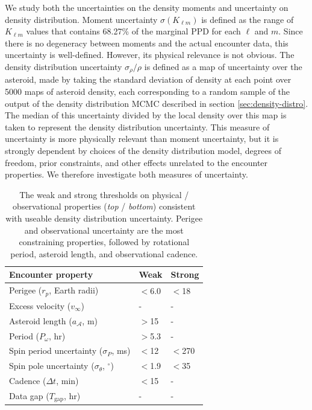 \documentclass[fleqn,usenatbib]{mnras}
\begin{document}
We study both the uncertainties on the density moments and uncertainty on density distribution. Moment uncertainty $\sigma (K_{\ell m})$ is defined as the range of $K_{\ell m}$ values that contains 68.27\% of the marginal PPD for each $\ell$ and $m$. Since there is no degeneracy between moments and the actual encounter data, this uncertainty is well-defined. However, its physical relevance is not obvious. The density distribution uncertainty $\sigma_\rho / \rho$ is defined as a map of uncertainty over the asteroid, made by taking the standard deviation of density at each point over 5000 maps of asteroid density, each corresponding to a random sample of the output of the density distribution MCMC described in section \ref{sec:density-distro}. The median of this uncertainty divided by the local density over this map is taken to represent the density distribution uncertainty. This measure of uncertainty is more physically relevant than moment uncertainty, but it is strongly dependent by choices of the density distribution model, degrees of freedom, prior constraints, and other effects unrelated to the encounter properties. We therefore investigate both measures of uncertainty. 

\begin{table}
  \centering
  \begin{tabular}{lll} \hline
    Encounter property & Weak & Strong \\ \hline
    Perigee ($r_p$, Earth radii) & $<$6.0 & $<$18\\
    Excess velocity ($v_\infty$) & - & - \\
    Asteroid length ($a_\mathcal{A}$, m) & $>$15 & - \\
    Period ($P_\omega$, hr) & $>$5.3 & - \\ \hline
    Spin period uncertainty ($\sigma_P$, ms) & $<$12 & $<$270\\
    Spin pole uncertainty ($\sigma_\theta$, $^\circ$) & $<$1.9 & $<$35 \\
    Cadence ($\Delta t$, min) & $<$15 & - \\
    Data gap ($T_\text{gap}$, hr) & - & - \\ 
    \hline
  \end{tabular}
  \caption{The weak and strong thresholds on physical / observational properties (\textit{top} / \textit{bottom}) consistent with useable density distribution uncertainty. Perigee and observational uncertainty are the most constraining properties, followed by rotational period, asteroid length, and observational cadence.}
  \label{tab:threshold-summary}
\end{table}
\end{document}
